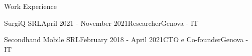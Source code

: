 \documentclass{resume} %
\begin{document}
\begin{rSection}{Work Experience}


\begin{rSubsection}{SurgiQ SRL}{April 2021 - November 2021}{Researcher}{Genova - IT}
\end{rSubsection}
\begin{rSubsection}{Secondhand Mobile SRL}{February 2018 - April 2021}{CTO e Co-founder}{Genova - IT}
\end{rSubsection}




\end{rSection}



\end{document}
